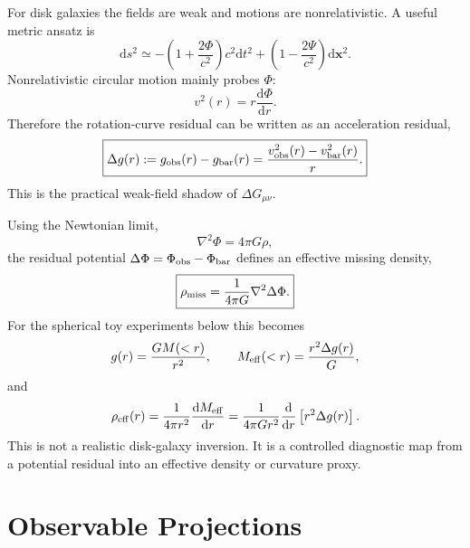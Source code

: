 \documentclass[10pt]{article}
\newcommand{\dd}{\mathrm{d}}
\begin{document}
For disk galaxies the fields are weak and motions are nonrelativistic. A useful metric ansatz is
\begin{equation}
\dd s^2
\simeq
-\left(1+\frac{2\Phi}{c^2}\right)c^2\dd t^2
+
\left(1-\frac{2\Psi}{c^2}\right)\dd\mathbf{x}^2 .
\end{equation}
Nonrelativistic circular motion mainly probes $\Phi$:
\begin{equation}
v^2(r)=r\frac{\dd\Phi}{\dd r}.
\end{equation}
Therefore the rotation-curve residual can be written as an acceleration residual,
\begin{equation}
\boxed{
\Delta g(r)
:=
g_{\rm obs}(r)-g_{\rm bar}(r)
=
\frac{v_{\rm obs}^2(r)-v_{\rm bar}^2(r)}{r}.
}
\end{equation}
This is the practical weak-field shadow of $\Delta G_{\mu\nu}$.

Using the Newtonian limit,
\begin{equation}
\nabla^2\Phi=4\pi G\rho,
\end{equation}
the residual potential $\Delta\Phi=\Phi_{\rm obs}-\Phi_{\rm bar}$ defines an effective missing density,
\begin{equation}
\boxed{
\rho_{\rm miss}
=
\frac{1}{4\pi G}\nabla^2\Delta\Phi .
}
\end{equation}
For the spherical toy experiments below this becomes
\begin{equation}
g(r)=\frac{GM(<r)}{r^2},
\qquad
M_{\rm eff}(<r)
=
\frac{r^2\Delta g(r)}{G},
\end{equation}
and
\begin{equation}
\rho_{\rm eff}(r)
=
\frac{1}{4\pi r^2}\frac{\dd M_{\rm eff}}{\dd r}
=
\frac{1}{4\pi G r^2}
\frac{\dd}{\dd r}\left[r^2\Delta g(r)\right].
\end{equation}
This is not a realistic disk-galaxy inversion. It is a controlled diagnostic map from a potential residual into an effective density or curvature proxy.

\section{Observable Projections}
\end{document}
